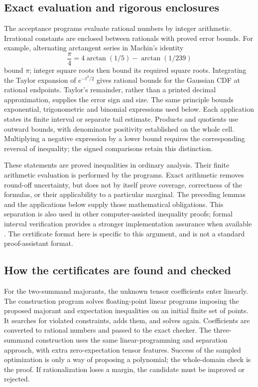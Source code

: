 \subsection{Exact evaluation and rigorous enclosures}
\label{j:cert:arithmetic}
The acceptance programs evaluate rational numbers by integer arithmetic.
Irrational constants are enclosed between rationals with proved error
bounds. For example, alternating arctangent series in Machin's identity
\[
 \frac\pi4=4\arctan(1/5)-\arctan(1/239)
\]
bound $\pi$; integer square roots then bound its required square roots.
Integrating the Taylor expansion of $e^{-t^2/2}$ gives rational bounds
for the Gaussian CDF at rational endpoints. Taylor's remainder, rather
than a printed decimal approximation, supplies the error sign and size.
The same principle bounds exponential, trigonometric and binomial
expressions used below. Each application states its finite interval or
separate tail estimate. Products and quotients use outward bounds, with
denominator positivity established on the whole cell. Multiplying a
negative expression by a lower bound requires the corresponding reversal
of inequality; the signed comparisons retain this distinction.

These statements are proved inequalities in ordinary analysis. Their
finite arithmetic evaluation is performed by the programs. Exact
arithmetic removes round-off uncertainty, but does not by itself prove
coverage, correctness of the formulas, or their applicability to a
particular marginal. The preceding lemmas and the applications below
supply those mathematical obligations. This separation is also used in
other computer-assisted inequality proofs; formal interval verification
provides a stronger implementation assurance when available
\cite{SolovyevHales2013}. The certificate format here is specific to this
argument, and is not a standard proof-assistant format.

\subsection{How the certificates are found and checked}
\label{j:cert:discovery}
For the two-summand majorants, the unknown tensor coefficients enter
linearly. The construction program solves floating-point linear
programs imposing the proposed majorant and expectation inequalities
on an initial finite set of points. It searches for violated constraints,
adds them, and solves again. Coefficients are converted to rational
numbers and passed to the exact checker. The three-summand construction
uses the same linear-programming and separation approach, with extra
zero-expectation tensor features. Success of the sampled optimization
is only a way of proposing a polynomial; the whole-domain check is the
proof. If rationalization loses a margin, the candidate must be improved
or rejected.

